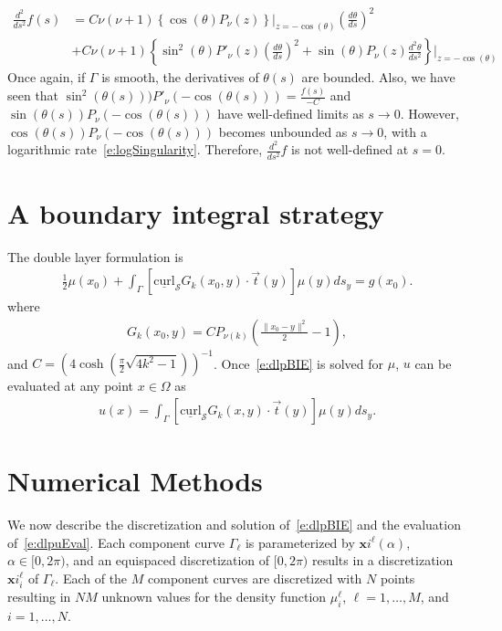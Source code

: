 \documentclass[final]{siamltex}
\renewcommand{\S} {\mathcal{S}}
\begin{document}
{\begin{itemize}
\begin{align*}
  \frac{d^2}{ds^2}f(s) &=  C\nu(\nu+1)\left\{
  \cos(\theta) P_\nu(z)
  \right\}\vert_{z=-\cos(\theta)}(\frac{d\theta}{ds})^2 \\
&+  C\nu(\nu+1)\left\{\sin^2(\theta) P'_{\nu}(z) (\frac{d\theta}{ds})^2
+ \sin(\theta)P_\nu(z) \frac{d^2 \theta}{d
s^2}\right\}\vert_{z=-\cos(\theta)}
\end{align*}
Once again, if $\Gamma$ is smooth, the derivatives of $\theta(s)$ are
bounded. Also, we have seen that
$\sin^2(\theta(s)))P'_{\nu}(-\cos(\theta(s))) =\frac{f(s)}{-C} $ and
$\sin(\theta(s))P_\nu(-\cos(\theta(s)))$ have well-defined limits as
$s\rightarrow 0$. However, $ \cos(\theta(s))P_{\nu}(-\cos(\theta(s)))$
becomes unbounded as $s\rightarrow 0$, with a logarithmic
rate~\eqref{e:logSingularity}. Therefore, $\frac{d^2}{ds^2}f$ is not
well-defined at $s=0$.



\end{itemize}


}



\section{A boundary integral strategy}

The double layer formulation is
\begin{align}
  \label{e:dlpBIE}
  \frac{1}{2}\mu(x_{0}) + \int_{\Gamma}
    [\underline{\mbox{curl}}_{\S}G_{k}(x_{0},y) \cdot
    \vec{t}(y)] \mu(y)ds_{y} = g(x_{0}).
\end{align}
where
\begin{align*}
  G_{k}(x_{0},y) = CP_{\nu(k)} \left(
    \frac{\|x_{0} - y\|^{2}}{2} - 1\right),
\end{align*}
and $C = (4\cosh(\frac{\pi}{2}\sqrt{4k^{2}-1}))^{-1}$.
Once~\eqref{e:dlpBIE} is solved for $\mu$, $u$ can be evaluated at any
point $x \in \Omega$ as
\begin{align}
  \label{e:dlpuEval}
  u(x) = \int_{\Gamma} [\underline{\mbox{curl}}_{\S}G_{k}(x,y) 
    \cdot \vec{t}(y)] \mu(y)ds_{y}.
\end{align}




\section{Numerical Methods}
\label{s:numerics}
We now describe the discretization and solution of~\eqref{e:dlpBIE} and
the evaluation of~\eqref{e:dlpuEval}.  Each component curve
$\Gamma_{\ell}$ is parameterized by ${\mathbf x}i^{\ell}(\alpha)$, $\alpha \in
[0,2\pi)$, and an equispaced discretization of $[0,2\pi)$ results in a
discretization ${\mathbf x}i_{i}^{\ell}$ of $\Gamma_{\ell}$.  Each of the $M$
component curves are discretized with $N$ points resulting in $NM$
unknown values for the density function $\mu_{i}^{\ell}$, $\ell =
1,\ldots,M$, and $i = 1,\ldots,N$.
\end{document}
